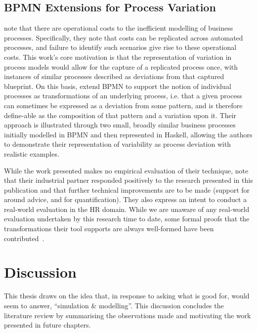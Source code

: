 \subsection{BPMN Extensions for Process Variation}

\citeauthor{Machado_2011} note that there are operational costs to the
inefficient modelling of business processes. Specifically, they note that costs
can be replicated across automated processes, and failure to identify such
scenarios give rise to these operational costs. This work's core motivation is
that the representation of variation in process models would allow for the
capture of a replicated process once, with instances of similar processes
described as deviations from that captured blueprint. On this basis,
\citeauthor{Machado_2011} extend BPMN to support the notion of individual
processes as transformations of an underlying process, i.e. that a given process
can sometimes be expressed as a deviation from some pattern, and is therefore
define-able as the composition of that pattern and a variation upon it. Their
approach is illustrated through two small, broadly similar business processes
initially modelled in BPMN and then represented in Haskell, allowing the authors
to demonstrate their representation of variability as process deviation with
realistic examples.

While the work presented makes no empirical evaluation of their technique,
\citeauthor{Machado_2011} note that their industrial partner responded
positively to the research presented in this publication and that further
technical improvements are to be made (support for around advice, and for
quantification). They also express an intent to conduct a real-world evaluation
in the HR domain. While we are unaware of any real-world evaluation undertaken
by this research time to date, some formal proofs that the transformations their
tool supports are always well-formed have been
contributed~\cite{machado2012formal}.



\section{Discussion}\label{sec:lit_discussion}


This thesis draws on the idea that, in response to
  \citeauthor{steimann06paradoxical} asking what \aspectorientation{} is good for,
\citeauthor{gulyas1999use} would seem to answer, ``simulation \&
  modelling''. This discussion concludes the literature review by summarising
  the observations made and motivating the work presented in future chapters.

